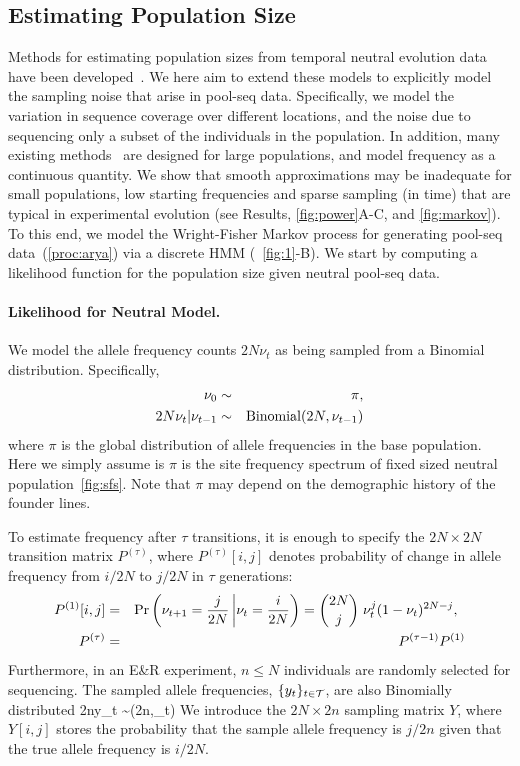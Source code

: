 \subsection{Estimating Population Size}
Methods for estimating population sizes from temporal neutral
evolution data have been
developed~\cite{williamson1999using,anderson2000monte,
  bollback2008estimation, Terhorst2015Multi,jonas2016estimating}.
We here aim to extend these models to explicitly model the sampling noise 
that arise in
pool-seq data. Specifically, we model the variation in sequence
coverage over different locations, and the noise due to sequencing
only a subset of the individuals in the population.  In addition, many
existing
methods~\cite{bollback2008estimation,feder2014Identifying,topa2015gaussian,Terhorst2015Multi}
are designed for large populations, and model frequency as a
continuous quantity. We show that smooth approximations may
be inadequate for small populations, low starting frequencies and
sparse sampling (in time) that are typical in experimental evolution
(see Results, \ref{fig:power}A-C, and \ref{fig:markov}). To this end,
we model the Wright-Fisher Markov process for generating pool-seq
data~(\ref{proc:arya}) via a {discrete} HMM (~\ref{fig:1}-B). We
start by computing a likelihood function for the population size given
neutral pool-seq data.


\paragraph{Likelihood for Neutral Model.}
We model the allele frequency counts $2N\nu_t$ as being sampled from a
Binomial distribution. Specifically,
\begin{eqnarray*} 
  \nu_0 &\sim& \pi,\\
  2N\nu_t|\nu_{t-1} &\sim& \operatorname{Binomial}(2N,\nu_{t-1}) 
\end{eqnarray*}
where $\pi$ is the global distribution of allele frequencies in the
base population. Here we simply assume is $\pi$ is the site frequency
spectrum of fixed sized neutral population~\ref{fig:sfs}. Note that $\pi$ may 
depend on the
demographic history of the founder lines.

To estimate frequency after $\tau$ transitions, it is enough to
specify the $2N\times2N$ transition matrix $P^{(\tau)}$, where
$P^{(\tau)}[i,j]$ denotes probability of change in allele frequency
from ${i}/{2N}$ to ${j}/{2N}$ in $\tau$ generations:
\begin{eqnarray}
  P^{(1)}[i,j] &=& \operatorname{Pr}\left(\nu_{t+1}=\frac{j}{2N} \left|
      \nu_{t}=\frac{i}{2N}\right)={2N \choose j} \right.  \nu_{t}^j
  (1-\nu_{t})^{2N-j}, \;\;\label{eq:P1}\\
  P^{(\tau)} &=&   P^{(\tau-1)}P^{(1)} \label{eq:Pt}
\end{eqnarray}
Furthermore, in an E\&R experiment, $n\le N$ individuals are randomly
selected for sequencing. The {sampled allele frequencies},
$\{y_{t}\}_{t\in{\cal T}}$, are also Binomially distributed \beq 2ny_{t}
\sim {}(2n,\nu_t) \eeq We introduce the $2N\times2n$
sampling matrix $Y$, where $Y[i,j]$ stores the probability that the
sample allele frequency is ${j}/{2n}$ given that the true allele
frequency is ${i}/{2N}$.

